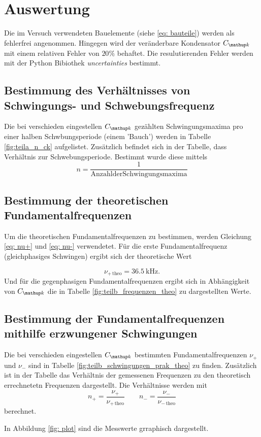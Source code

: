 \section{Auswertung}
Die im Versuch verwendeten Bauelemente (siehe \eqref{eq: bauteile})
werden als fehlerfrei angenommen.
Hingegen wird der veränderbare Kondensator $C\ua{k}$ mit
einem relativen Fehler von $20\%$ behaftet.
Die resulutierenden Fehler werden mit der Python Bibiothek 
\emph{uncertainties} bestimmt.

\subsection{Bestimmung des Verhältnisses von Schwingungs- und Schwebungsfrequenz}
Die bei verschieden eingestellen $C\ua{k}$ gezählten Schwingungsmaxima pro einer halben
Schwbungsperiode (einem 'Bauch') werden in Tabelle \ref{fig:teila_n_ck} aufgelistet.
Zusätzlich befindet sich in der Tabelle, dass Verhältnis zur Schwebungsperiode.
Bestimmt wurde diese mittels
\begin{equation*}
n=\frac{1}{\mathup{Anzahl der Schwingungsmaxima}}
\end{equation*}


\subsection{Bestimmung der theoretischen Fundamentalfrequenzen}
Um die theoretischen Fundamentalfrequenzen zu bestimmen, werden Gleichung \eqref{eq: nu+} und 
\eqref{eq: nu-} verwendetet.
Für die erste Fundamentalfrequenz (gleichphasiges Schwingen) ergibt sich der 
theoretische Wert

\begin{equation}
\label{eq:nu_plu_theo}
\nu_{+\,\mathup{theo}}=\SI{36,5}{\kilo\hertz}.
\end{equation}
Und für die gegenphasigen Fundamentalfrequenzen ergibt sich in Abhängigkeit von $C\ua{k}$ die in Tabelle \ref{fig:teilb_frequenzen_theo} zu dargestellten Werte. 


\subsection{Bestimmung der Fundamentalfrequenzen mithilfe erzwungener Schwingungen}
Die bei verschieden eingestellen $C\ua{k}$ bestimmten Fundamentalfrequenzen 
$\nu_+$ und $\nu_-$
sind in Tabelle \ref{fig:teilb_schwingungen_prak_theo} zu finden.
Zusätzlich ist in der Tabelle das Verhältnis der gemessenen Frequenzen 
zu den theoretisch errechnetetn Frequenzen dargestellt.
Die Verhältnisse werden mit
\begin{equation}
\label{eq:verh}
n_+=\frac{\nu_+}{\nu_{+\,\mathup{theo}}} \qquad n_-=\frac{\nu_-}{\nu_{-\,\mathup{theo}}}
\end{equation}
berechnet.
\FloatBarrier

\FloatBarrier
In Abbildung \ref{fig: plot} sind die Messwerte grraphisch dargestellt.

